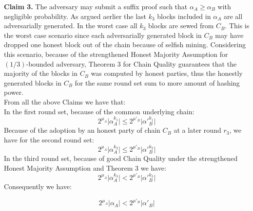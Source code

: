 \textbf{Claim 3.} The adversary may submit a suffix proof such that $\alpha_A \geq \alpha_B$
with negligible probability.
As argued aerlier the last $k_3$ blocks included in $\alpha_A$ are all adversarially generated. In the worst case  all $k_3 $ blocks
are sewed from $C_B$. This is the worst case scenario since each adversarially
generated block in $C_B$ may have dropped one honest block out of the chain
because of selfish mining. Considering this scenario, because of the strengthened
Honest Majority Assumption for $(1/3)$-bounded adversary, Theorem 3 for Chain
Quality guarantees that the majority of the blocks in $C_B$ was computed by
honest parties, thus the honestly generated blocks in $C_B$ for the same round
set sum to more amount of hashing power.\\
From all the above Claims we have that:\\
In the first round set, because of the common underlying chain:
\begin{equation} \label{eq_v_round_set_1}
2^{\mu_A} \vert \alpha_A^{k_1} \vert \leq 2^{\mu'_B} \vert \alpha'{_B^{k_1}} \vert
\end{equation}
Because of the adoption by an honest party of chain $C_B$ at a later round $r_3$, we
have for the second round set:
\begin{equation} \label{eq_v_round_set_2}
2^{\mu_A} \vert \alpha_A^{k_2} \vert \leq 2^{\mu'_B} \vert \alpha'{_B^{k_2}} \vert
\end{equation}
In the third round set, because of good Chain Quality under the strengthened Honest
Majority Assumption and Theorem 3 we have:
\begin{equation} \label{eq_v_round_set_3}
2^{\mu_A} \vert \alpha_A^{k_3} \vert < 2^{\mu'_B} \vert \alpha'{_B^{k_3}} \vert
\end{equation}
Consequently we have:

\begin{equation} \label{eq_v_all_round_sets}
2^{\mu_A} \vert \alpha_A \vert < 2^{\mu'_B} \vert \alpha'{_B} \vert
\end{equation}
